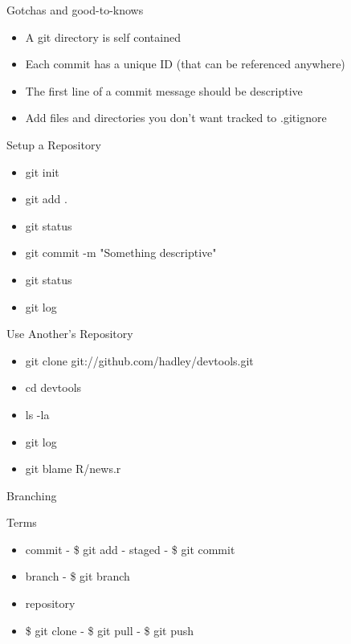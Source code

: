 \documentclass{beamer}
\begin{document}
\begin{frame}{Gotchas and good-to-knows}
  \begin{center}
    \begin{itemize}
      \item A git directory is self contained
      \item Each commit has a unique ID (that can be referenced
        anywhere)
      \item The first line of a commit message should be descriptive
      \item Add files and directories you don't want tracked to
        .gitignore
    \end{itemize}
  \end{center}
\end{frame}

\begin{frame}{Setup a Repository}
  \begin{center}
    \begin{itemize}
      \item git init
      \item git add .
      \item git status
      \item git commit -m "Something descriptive"
      \item git status
      \item git log
    \end{itemize}
  \end{center}
\end{frame}

\begin{frame}{Use Another's Repository}
  \begin{center}
    \begin{itemize}
      \item git clone git://github.com/hadley/devtools.git
      \item cd devtools
      \item ls -la
      \item git log
      \item git blame R/news.r
      \end{itemize}
  \end{center}
\end{frame}

\begin{frame}{Branching}
\end{frame}

\begin{frame}{Terms}
  \begin{center}
    \begin{itemize}
      \item commit - \$ git add - staged - \$ git commit
      \item branch - \$ git branch
      \item repository
      \item \$ git clone - \$ git pull - \$ git push
    \end{itemize}
  \end{center}
\end{frame}
\end{document}
